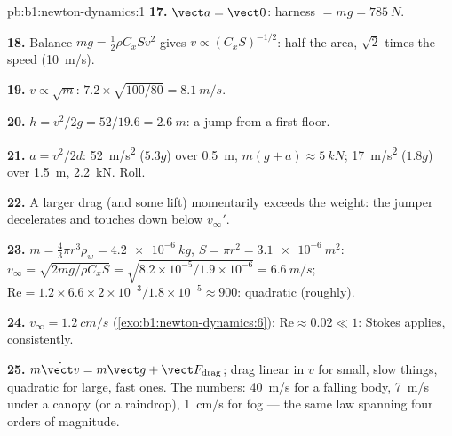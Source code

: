 \begin{solution}{pb:b1:newton-dynamics:1}
\textbf{17.} $\vect a = \vect 0$: harness  $= mg = \qty{785}{N}$.

\textbf{18.} Balance $mg = \tfrac12\rho C_xSv^2$ gives $v \propto (C_xS)^{-1/2}$:
half the area, $\sqrt2$ times the speed (\qty{10}{m/s}).

\textbf{19.} $v \propto \sqrt m$: $7.2 \times \sqrt{100/80} = \qty{8.1}{m/s}$.

\textbf{20.} $h = v^2/2g = 52/19.6 = \qty{2.6}{m}$: a jump from a first
floor.

\textbf{21.} $a = v^2/2d$: \qty{52}{m/s^2} ($5.3g$) over \qty{0.5}{m},
 $m(g + a) \approx \qty{5}{kN}$; \qty{17}{m/s^2} ($1.8g$) over
\qty{1.5}{m}, \qty{2.2}{kN}. Roll.

\textbf{22.} A larger drag (and some lift) momentarily exceeds the
weight: the jumper decelerates and touches down below $v_\infty'$.

\textbf{23.} $m = \tfrac43\pi r^3\rho_w = \qty{4.2e-6}{kg}$, $S = \pi r^2 =
\qty{3.1e-6}{m^2}$: $v_\infty = \sqrt{2mg/\rho C_xS} = \sqrt{8.2\times10^{-5}/
1.9\times10^{-6}} = \qty{6.6}{m/s}$; $\mathrm{Re} = 1.2 \times 6.6 \times
2\times10^{-3}/1.8\times10^{-5} \approx 900$: quadratic (roughly).

\textbf{24.} $v_\infty = \qty{1.2}{cm/s}$ (\cref{exo:b1:newton-dynamics:6});
$\mathrm{Re} \approx 0.02 \ll 1$: Stokes applies, consistently.

\textbf{25.} $m\dot{\vect v} = m\vect g + \vect F_{\text{drag}}$; drag linear
in $v$ for small, slow things, quadratic for large, fast ones. The
numbers: \qty{40}{m/s} for a falling body, \qty{7}{m/s} under a canopy
(or a raindrop), \qty{1}{cm/s} for fog --- the same law spanning four
orders of magnitude.
\end{solution}
